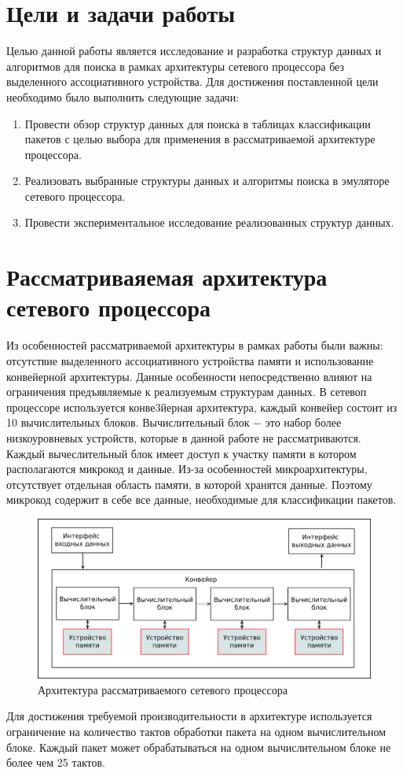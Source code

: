 \documentclass[a4peper, 12pt, titlepage, finall]{report}
\begin{document}
    \chapter{Цели и задачи работы}
        Целью данной работы является исследование и разработка структур данных и алгоритмов для поиска в
        рамках архитектуры сетевого процессора без выделенного ассоциативного устройства.
        Для достижения поставленной цели необходимо было выполнить следующие задачи:
        \begin{enumerate}
            \item Провести обзор структур данных для поиска в таблицах классификации пакетов с целью выбора для применения в рассматриваемой архитектуре процессора.
            \item Реализовать выбранные структуры данных и алгоритмы поиска в эмуляторе сетевого процессора.
            \item Провести экспериментальное исследование реализованных структур данных.
        \end{enumerate}
       
    \chapter{Рассматриваяемая архитектура сетевого процессора}
        Из особенностей рассматриваемой архитектуры в рамках работы были важны: отсутствие выделенного ассоциативного устройства памяти и использование конвейерной архитектуры. 
        Данные особенности непосредственно влияют на ограничения предъявляемые к реализуемым структурам данных. В сетевоп процессоре используется конве3йерная 
        архитектура, каждый конвейер состоит из 10 вычислительных блоков. Вычислительный блок $-$ это набор более низкоуровневых устройств,
        которые в данной работе не рассматриваются. Каждый вычеслительный блок имеет доступ к участку памяти в котором располагаются микрокод и данные.
        Из-за особенностей микроархитектуры, отсутствует отдельная область памяти, в которой хранятся данные. Поэтому микрокод содержит в себе все данные,
        необходимые для классификации пакетов.
        \begin{figure}[h]
            \includegraphics[width=\textwidth]{npu_all.png}
            \caption{Архитектура рассматриваемого сетевого процессора}
        \end{figure}
        Для достижения требуемой производительности в архитектуре используется ограничение на количество тактов обработки пакета
        на одном вычислительном блоке. Каждый пакет может обрабатываться на одном вычислительном блоке не более чем 25 тактов.
        
\end{document}
